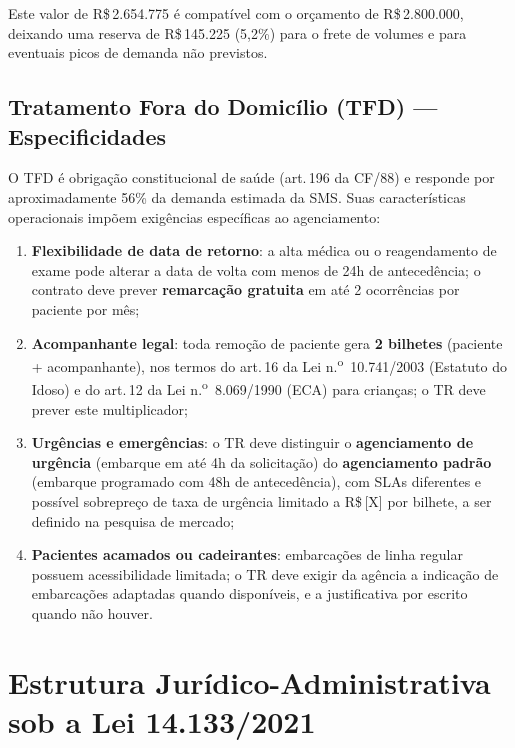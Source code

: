 \documentclass[12pt,a4paper]{article}
\newcommand{\art}[1]{art.\,#1}
\newcommand{\Rs}{R\$\,}
\begin{document}
Este valor de \Rs 2.654.775 é compatível com o orçamento de \Rs 2.800.000,
deixando uma reserva de \Rs 145.225 (5,2\%) para o frete de volumes e para
eventuais picos de demanda não previstos.

\subsection{Tratamento Fora do Domicílio (TFD) --- Especificidades}

O TFD é obrigação constitucional de saúde (\art{196} da CF/88) e responde
por aproximadamente 56\% da demanda estimada da SMS. Suas características
operacionais impõem exigências específicas ao agenciamento:

\begin{enumerate}
  \item \textbf{Flexibilidade de data de retorno}: a alta médica ou o
    reagendamento de exame pode alterar a data de volta com menos de 24h de
    antecedência; o contrato deve prever \textbf{remarcação gratuita} em até
    2 ocorrências por paciente por mês;

  \item \textbf{Acompanhante legal}: toda remoção de paciente gera
    \textbf{2 bilhetes} (paciente + acompanhante), nos termos do
    \art{16} da Lei n.\textsuperscript{o}~10.741/2003 (Estatuto do Idoso)
    e do \art{12} da Lei n.\textsuperscript{o}~8.069/1990 (ECA) para
    crianças; o TR deve prever este multiplicador;

  \item \textbf{Urgências e emergências}: o TR deve distinguir o
    \textbf{agenciamento de urgência} (embarque em até 4h da solicitação)
    do \textbf{agenciamento padrão} (embarque programado com 48h de
    antecedência), com SLAs diferentes e possível sobrepreço de taxa de
    urgência limitado a \Rs [X] por bilhete, a ser definido na pesquisa
    de mercado;

  \item \textbf{Pacientes acamados ou cadeirantes}: embarcações de linha
    regular possuem acessibilidade limitada; o TR deve exigir da agência
    a indicação de embarcações adaptadas quando disponíveis, e a
    justificativa por escrito quando não houver.
\end{enumerate}

\section{Estrutura Jurídico-Administrativa sob a Lei 14.133/2021}
\end{document}
